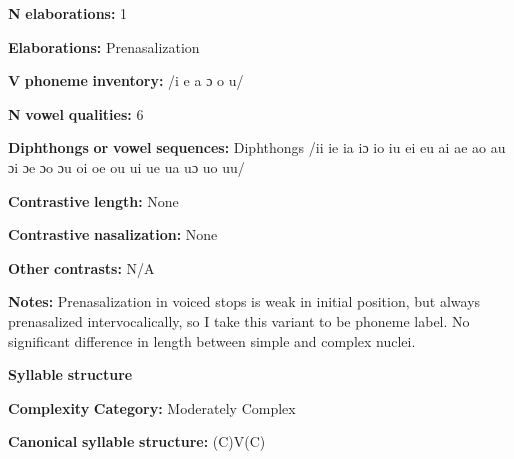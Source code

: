 \begin{styleBody}
\textbf{N} \textbf{elaborations:} 1
\end{styleBody}

\begin{styleBody}
\textbf{Elaborations:} Prenasalization
\end{styleBody}

\begin{styleBody}
\textbf{V} \textbf{phoneme} \textbf{inventory:} /i e a ɔ o u/
\end{styleBody}

\begin{styleBody}
\textbf{N} \textbf{vowel} \textbf{qualities:} 6
\end{styleBody}

\begin{styleBody}
\textbf{Diphthongs} \textbf{or} \textbf{vowel} \textbf{sequences:} Diphthongs /ii ie ia iɔ io iu ei eu ai ae ao au ɔi ɔe ɔo ɔu oi oe ou ui ue ua uɔ uo uu/
\end{styleBody}

\begin{styleBody}
\textbf{Contrastive} \textbf{length:} None
\end{styleBody}

\begin{styleBody}
\textbf{Contrastive} \textbf{nasalization:} None
\end{styleBody}

\begin{styleBody}
\textbf{Other} \textbf{contrasts:} N/A
\end{styleBody}

\begin{styleBody}
\textbf{Notes:} Prenasalization in voiced stops is weak in initial position, but always prenasalized intervocalically, so I take this variant to be phoneme label. No significant difference in length between simple and complex nuclei.
\end{styleBody}

\begin{styleBody}
\textbf{Syllable} \textbf{structure}
\end{styleBody}

\begin{styleBody}
\textbf{Complexity} \textbf{Category:} Moderately Complex
\end{styleBody}

\begin{styleBody}
\textbf{Canonical} \textbf{syllable} \textbf{structure:} (C)V(C) \citep[14-18]{McElhanon1970}
\end{styleBody}

